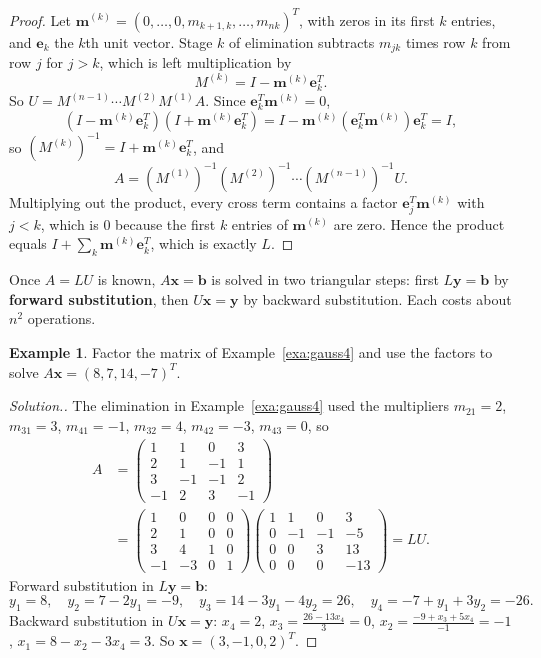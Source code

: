 \documentclass[11pt,a4paper]{article}
\numberwithin{equation}{section}
\theoremstyle{definition}
\newtheorem{exa}[thm]{Example}
\newenvironment{solution}
  {\renewcommand{\qedsymbol}{}\begin{proof}[\textit{Solution}.]}
  {\end{proof}}
\begin{document}
\begin{proof}
Let $\mathbf m^{(k)} = (0,\dots,0,m_{k+1,k},\dots,m_{nk})^T$, with zeros in its first $k$ entries, and $\mathbf e_k$ the $k$th unit vector.
Stage $k$ of elimination subtracts $m_{jk}$ times row $k$ from row $j$ for $j>k$, which is left multiplication by
$$M^{(k)} = I-\mathbf m^{(k)}\mathbf e_k^T .$$
So $U = M^{(n-1)}\cdots M^{(2)}M^{(1)}A$. Since $\mathbf e_k^T\mathbf m^{(k)} = 0$,
$$(I-\mathbf m^{(k)}\mathbf e_k^T)(I+\mathbf m^{(k)}\mathbf e_k^T) = I-\mathbf m^{(k)}(\mathbf e_k^T\mathbf m^{(k)})\mathbf e_k^T = I,$$
so $\left(M^{(k)}\right)^{-1} = I+\mathbf m^{(k)}\mathbf e_k^T$, and
$$A = \left(M^{(1)}\right)^{-1}\left(M^{(2)}\right)^{-1}\cdots\left(M^{(n-1)}\right)^{-1}U .$$
Multiplying out the product, every cross term contains a factor $\mathbf e_j^T\mathbf m^{(k)}$ with $j<k$, which is $0$ because the first $k$
entries of $\mathbf m^{(k)}$ are zero. Hence the product equals $I+\sum_k\mathbf m^{(k)}\mathbf e_k^T$, which is exactly $L$.
\end{proof}

Once $A = LU$ is known, $A\mathbf x = \mathbf b$ is solved in two triangular steps: first $L\mathbf y = \mathbf b$ by \textbf{forward
substitution}, then $U\mathbf x = \mathbf y$ by backward substitution. Each costs about $n^2$ operations.

\begin{exa}
\label{exa:lu4}
Factor the matrix of Example~\ref{exa:gauss4} and use the factors to solve $A\mathbf x = (8,7,14,-7)^T$.
\end{exa}

\begin{solution}
The elimination in Example~\ref{exa:gauss4} used the multipliers $m_{21} = 2$, $m_{31} = 3$, $m_{41} = -1$, $m_{32} = 4$, $m_{42} = -3$,
$m_{43} = 0$, so
\begin{align*}
A &= \begin{pmatrix}1&1&0&3\\2&1&-1&1\\3&-1&-1&2\\-1&2&3&-1\end{pmatrix}\\
&= \begin{pmatrix}1&0&0&0\\2&1&0&0\\3&4&1&0\\-1&-3&0&1\end{pmatrix}\begin{pmatrix}1&1&0&3\\0&-1&-1&-5\\0&0&3&13\\0&0&0&-13\end{pmatrix} = LU .
\end{align*}
Forward substitution in $L\mathbf y = \mathbf b$:
$$y_1 = 8,\quad y_2 = 7-2y_1 = -9,\quad y_3 = 14-3y_1-4y_2 = 26,\quad y_4 = -7+y_1+3y_2 = -26 .$$
Backward substitution in $U\mathbf x = \mathbf y$: $x_4 = 2$, $x_3 = \frac{26-13x_4}{3} = 0$, $x_2 = \frac{-9+x_3+5x_4}{-1} = -1$,
$x_1 = 8-x_2-3x_4 = 3$. So $\mathbf x = (3,-1,0,2)^T$.
\end{solution}
\end{document}
